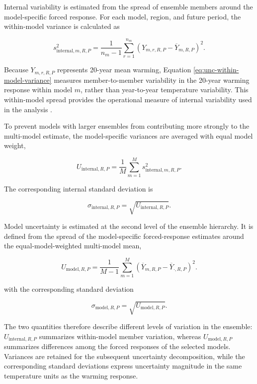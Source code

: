 \documentclass[
]{krantz}
\begin{document}
Internal variability is estimated from the spread of ensemble members around the model-specific forced response. For each model, region, and future period, the within-model variance is calculated as

\begin{equation}
s^2_{\mathrm{internal},m,R,P}
=
\frac{1}{n_m-1}
\sum_{r=1}^{n_m}
\left(
Y_{m,r,R,P}
-
\overline{Y}_{m,R,P}
\right)^2.
\label{eq:unc-within-model-variance}
\end{equation}

Because \(Y_{m,r,R,P}\) represents 20-year mean warming, Equation \eqref{eq:unc-within-model-variance} measures member-to-member variability in the 20-year warming response within model \(m\), rather than year-to-year temperature variability. This within-model spread provides the operational measure of internal variability used in the analysis \citep{Deser2020, Lehner2020}.

To prevent models with larger ensembles from contributing more strongly to the multi-model estimate, the model-specific variances are averaged with equal model weight,

\begin{equation}
U_{\mathrm{internal},R,P}
=
\frac{1}{M}
\sum_{m=1}^{M}
s^2_{\mathrm{internal},m,R,P}.
\label{eq:unc-internal-variance}
\end{equation}

The corresponding internal standard deviation is

\[
\sigma_{\mathrm{internal},R,P}
=
\sqrt{U_{\mathrm{internal},R,P}}.
\]

Model uncertainty is estimated at the second level of the ensemble hierarchy. It is defined from the spread of the model-specific forced-response estimates around the equal-model-weighted multi-model mean,

\begin{equation}
U_{\mathrm{model},R,P}
=
\frac{1}{M-1}
\sum_{m=1}^{M}
\left(
\overline{Y}_{m,R,P}
-
\overline{Y}_{\cdot,R,P}
\right)^2.
\label{eq:unc-model-variance}
\end{equation}

with the corresponding standard deviation

\[
\sigma_{\mathrm{model},R,P}
=
\sqrt{U_{\mathrm{model},R,P}}.
\]

The two quantities therefore describe different levels of variation in the ensemble: \(U_{\mathrm{internal},R,P}\) summarizes within-model member variation, whereas \(U_{\mathrm{model},R,P}\) summarizes differences among the forced responses of the selected models. Variances are retained for the subsequent uncertainty decomposition, while the corresponding standard deviations express uncertainty magnitude in the same temperature units as the warming response.
\end{document}
